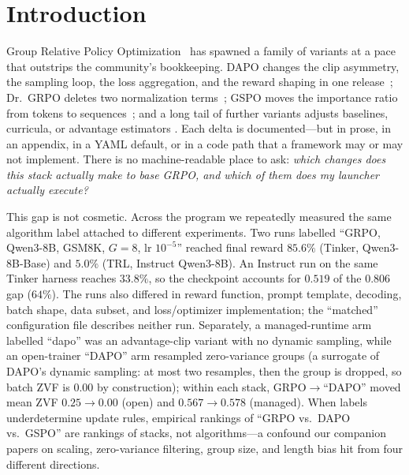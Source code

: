 \section{Introduction}
\label{sec:p6-intro}
Group Relative Policy Optimization~\citep{shao2024deepseekmath, guo2025deepseekr1}
has spawned a family of variants at a pace that outstrips the community's
bookkeeping. DAPO changes the clip asymmetry, the sampling loop, the loss
aggregation, and the reward shaping in one release~\citep{yu2025dapo}; Dr.~GRPO
deletes two normalization terms~\citep{tong2025drgrpo}; GSPO moves the
importance ratio from tokens to sequences~\citep{qwen2025gspo}; and a long tail
of further variants adjusts baselines, curricula, or advantage estimators
\citep{lin2025cppo, nan2025ngrpo, zhang2025scaffgrpo, mcgrpo2025, gift2025,
ichihara2025mogrpo, lu2025grpolead, bytedance2025vapo,
le2025rlzvp}. Each delta is documented---but in prose, in
an appendix, in a YAML default, or in a code path that a framework may or may
not implement. There is no machine-readable place to ask: \emph{which changes
does this stack actually make to base GRPO, and which of them does my launcher
actually execute?}

This gap is not cosmetic. Across the \ours{} program we repeatedly measured the
same algorithm label attached to different experiments. Two runs labelled
``GRPO, Qwen3-8B, GSM8K, $G{=}8$, lr $10^{-5}$'' reached final reward $85.6\%$
(Tinker, Qwen3-8B-Base) and $5.0\%$ (TRL, Instruct Qwen3-8B). An Instruct
run on the same Tinker harness reaches $33.8\%$, so the checkpoint accounts
for $0.519$ of the $0.806$ gap ($64\%$). The runs also differed in reward function, prompt template,
decoding, batch shape, data subset, and loss/optimizer implementation; the
``matched'' configuration file describes neither run. Separately, a managed-runtime
arm labelled ``dapo'' was an advantage-clip variant with no dynamic sampling,
while an open-trainer ``DAPO'' arm resampled zero-variance groups (a surrogate
of DAPO's dynamic sampling: at most two resamples, then the group is dropped,
so batch ZVF is $0.00$ by construction); within each stack, GRPO$\to$``DAPO'' moved mean ZVF $0.25\to0.00$
(open) and $0.567\to0.578$ (managed). When labels underdetermine update rules, empirical rankings of ``GRPO vs.\ DAPO
vs.\ GSPO'' are rankings of stacks, not algorithms---a confound our companion
papers on scaling, zero-variance filtering, group size, and length bias hit
from four different directions.

